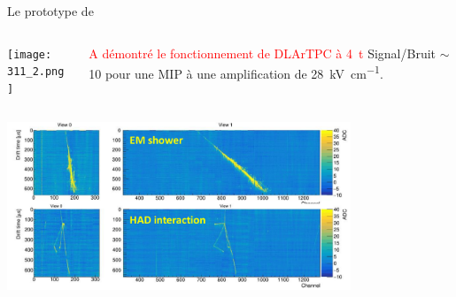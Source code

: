     {
        \begin{specialframe}
            \vspace{2cm}\hspace*{-1.8cm}\parbox[t]{\textwidth}{
                \begin{center}
                    \begin{Huge}
                            \textcolor{pheniics_purple}{\textbf{\insertsection}}
                    \end{Huge}
                \end{center}
            }
        \end{specialframe}
    }

    \begin{frame}{Le prototype de \TOO{}}
		\begin{columns}
			\begin{column}{0.48\textwidth}
				\centering
				\texttt{[image: 311\_2.png]}
			\end{column}\hfill
			\begin{column}{0.48\textwidth}
				\begin{scriptsize}
					\textcolor{red}{A démontré le fonctionnement de DLArTPC à \SI{4}{\tonne}}
					Signal/Bruit $\sim$ 10 pour une MIP à une amplification de \SI{28}{\kilo\volt\per\centi\meter}.
				\end{scriptsize}
			\end{column}\hfill
		\end{columns}
		\centering
		\includegraphics[width=0.77\textwidth]{./pictures/events.png}\\
	\end{frame}
	    
